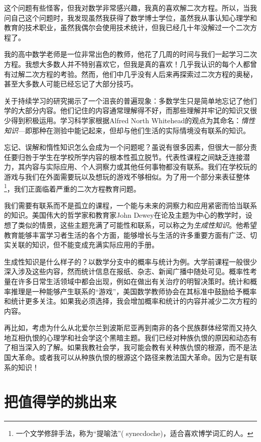 这个问题有些怪客，但我对数学非常感兴趣，我真的喜欢解二次方程。所以，当我问自己这个问题时，我发现虽然我获得了数学博士学位，虽然我从事认知心理学和教育的技术职业，虽然我偶尔会使用技术统计，但我已经几十年没解过一个二次方程了。

我的高中数学老师是一位非常出色的教师，他花了几周的时间与我们一起学习二次方程。我想大多数人并不特别喜欢它，但我是真的喜欢！几乎我认识的每个人都曾有过解二次方程的考验。然而，他们中几乎没有人后来再探索过二次方程的奥秘，甚至大多数人可能已经忘记了大部分技巧。

关于持续学习的研究揭示了一个沮丧的普遍现象：多数学生只是简单地忘记了他们学的大部分内容。他们记住的内容通常理解得不好，而那些理解并牢记的知识又很少得到积极运用。学习科学家根据Alfred North Whitehead的观点为其命名：\textit{惰性知识}---即那种在测验中能记起来，但却与他们生活的实际情境没有联系的知识。

忘记、误解和惰性知识怎么会成为一个问题呢？虽说有很多因素，但很大一部分责任要归咎于学生在学校所学内容的根本性孤立脱节。代表性课程之间缺乏连接潜力，其内容与实际应用、个人洞察力或其他任何事物都没有联系。我们在学校玩的游戏与我们在外面需要玩以及想玩的游戏不够相似。为了用一个部分来表征整体\footnote{一个文学修辞手法，称为“提喻法”( synecdoche)，适合喜欢博学词汇的人。}，我们正面临着严重的二次方程教育问题。

我们需要有联系而不是孤立的课程，一个能与未来的洞察力和应用紧密而恰当联系的知识。美国伟大的哲学家和教育家John Dewey在论及主题为中心的教学时，设想了类似的情景，这些主题充满了可能性和联系，可以称之为\textit{生成性知识}。他希望教育能够丰富学习者生活的各个方面，能够增长与生活的许多重要方面有广泛、切实关联的知识，但不能变成充满实际应用的手册。

生成性知识是什么样子的？以数学分支中的概率与统计为例。大学前课程一般很少深入涉及这些内容，然而统计信息在报纸、杂志、新闻广播中随处可见。概率性考量在许多日常生活领域中都会出现，例如在做出有关治疗的明智决策时。统计和概率推理是一种能够产生联系的“游戏”，美国数学教师协会在其标准中鼓励给予概率和统计更多关注。如果我必须选择，我会增加概率和统计的内容并减少二次方程的内容。

再比如，考虑为什么从北爱尔兰到波斯尼亚再到南非的各个民族群体经常而又持久地互相仇恨的心理学和社会学这个黑暗主题。我们已经对种族仇恨的原因和动态有了相当深入的了解。如果我教社会学，我可能会教有关种族仇恨的根源，而不是法国大革命。或者我可以从种族仇恨的根源这个路径来教法国大革命。因为它是有联系的知识！

\section*{把值得学的挑出来}

